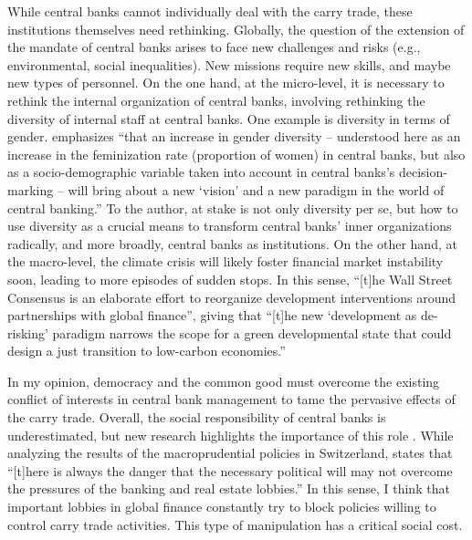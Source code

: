 \documentclass[a4paper, twoside]{templates/ociamthesis}
\begin{document}
While central banks cannot individually deal with the carry trade, these institutions themselves need rethinking. Globally, the question of the extension of the mandate of central banks arises to face new challenges and risks (e.g., environmental, social inequalities). New missions require new skills, and maybe new types of personnel. On the one hand, at the micro-level, it is necessary to rethink the internal organization of central banks, involving rethinking the diversity of internal staff at central banks. One example is diversity in terms of gender. \textcite[ 152]{vallet2020} emphasizes ``that an increase in gender diversity -- understood here as an increase in the feminization rate (proportion of women) in central banks, but also as a socio-demographic variable taken into account in central banks's decision-marking -- will bring about a new `vision' and a new paradigm in the world of central banking.'' To the author, at stake is not only diversity per se, but how to use diversity as a crucial means to transform central banks' inner organizations radically, and more broadly, central banks as institutions. On the other hand, at the macro-level, the climate crisis will likely foster financial market instability soon, leading to more episodes of sudden stops. In this sense, ``{[}t{]}he Wall Street Consensus is an elaborate effort to reorganize development interventions around partnerships with global finance'', giving that ``{[}t{]}he new `development as de-risking' paradigm narrows the scope for a green developmental state that could design a just transition to low-carbon economies.'' \autocite[ 429]{gabor2021}

In my opinion, democracy and the common good must overcome the existing conflict of interests in central bank management to tame the pervasive effects of the carry trade. Overall, the social responsibility of central banks is underestimated, but new research highlights the importance of this role \autocite[e.g.,][]{vallet2021}. While analyzing the results of the macroprudential policies in Switzerland, \textcite{danthine2016} states that ``{[}t{]}here is always the danger that the necessary political will may not overcome the pressures of the banking and real estate lobbies.'' In this sense, I think that important lobbies in global finance constantly try to block policies willing to control carry trade activities. This type of manipulation has a critical social cost.
\end{document}
